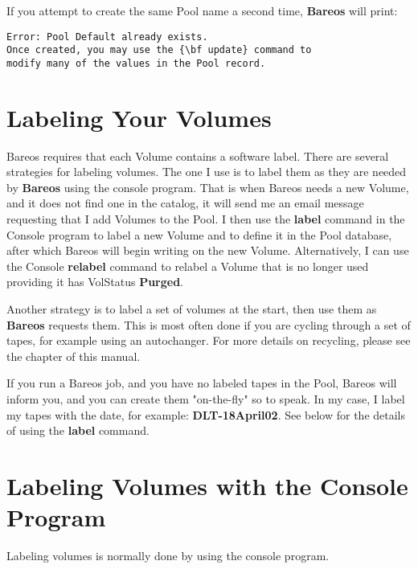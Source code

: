 If you attempt to create the same Pool name a second time, {\bf Bareos} will
print:

\footnotesize
\begin{verbatim}
Error: Pool Default already exists.
Once created, you may use the {\bf update} command to
modify many of the values in the Pool record.
\end{verbatim}
\normalsize


\section{Labeling Your Volumes}
\label{Labeling}

Bareos requires that each Volume contains a software label. There are several
strategies for labeling volumes. The one I use is to label them as they are
needed by {\bf Bareos} using the console program. That is when Bareos needs a
new Volume, and it does not find one in the catalog, it will send me an email
message requesting that I add Volumes to the Pool. I then use the {\bf label}
command in the Console program to label a new Volume and to define it in the
Pool database, after which Bareos will begin writing on the new Volume.
Alternatively, I can use the Console {\bf relabel} command to relabel a Volume
that is no longer used providing it has VolStatus {\bf Purged}.

Another strategy is to label a set of volumes at the start, then use them as
{\bf Bareos} requests them. This is most often done if you are cycling through
a set of tapes, for example using an autochanger. For more details on
recycling, please see the
 chapter of
this manual.

If you run a Bareos job, and you have no labeled tapes in the Pool, Bareos
will inform you, and you can create them "on-the-fly" so to speak. In my
case, I label my tapes with the date, for example: {\bf DLT-18April02}. See
below for the details of using the {\bf label} command.

\section{Labeling Volumes with the Console Program}

Labeling volumes is normally done by using the console program.

